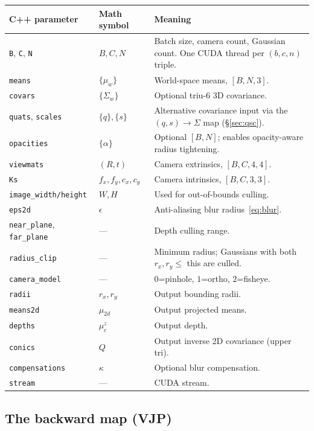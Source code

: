 \documentclass[11pt]{article}
\begin{document}
\begin{center}
\begin{tabular}{l l p{7.5cm}}
\hline
\textbf{C++ parameter} & \textbf{Math symbol} & \textbf{Meaning} \\
\hline
\texttt{B}, \texttt{C}, \texttt{N} & $B, C, N$ &
Batch size, camera count, Gaussian count. One CUDA thread per
$(b, c, n)$ triple. \\
\texttt{means} & $\{\mu_w\}$ & World-space means, $[B,N,3]$. \\
\texttt{covars} & $\{\Sigma_w\}$ & Optional triu-6 3D covariance. \\
\texttt{quats}, \texttt{scales} & $\{q\}, \{s\}$ & Alternative
covariance input via the $(q,s) \to \Sigma$ map (\S\ref{sec:qsc}). \\
\texttt{opacities} & $\{\alpha\}$ & Optional $[B,N]$; enables
opacity-aware radius tightening. \\
\texttt{viewmats} & $(R, t)$ & Camera extrinsics, $[B,C,4,4]$. \\
\texttt{Ks} & $f_x, f_y, c_x, c_y$ & Camera intrinsics, $[B,C,3,3]$. \\
\texttt{image\_width/height} & $W, H$ & Used for out-of-bounds culling. \\
\texttt{eps2d} & $\epsilon$ & Anti-aliasing blur radius~\eqref{eq:blur}. \\
\texttt{near\_plane}, \texttt{far\_plane} & --- & Depth culling range. \\
\texttt{radius\_clip} & --- & Minimum radius; Gaussians with both
$r_x, r_y \le$ this are culled. \\
\texttt{camera\_model} & --- & $0$=pinhole, $1$=ortho, $2$=fisheye. \\
\texttt{radii} & $r_x, r_y$ & Output bounding radii. \\
\texttt{means2d} & $\mu_{2d}$ & Output projected means. \\
\texttt{depths} & $\mu_c^z$ & Output depth. \\
\texttt{conics} & $Q$ & Output inverse 2D covariance (upper tri). \\
\texttt{compensations} & $\kappa$ & Optional blur compensation. \\
\texttt{stream} & --- & CUDA stream. \\
\hline
\end{tabular}
\end{center}

\subsection{The backward map (VJP)}
\label{sec:projection-bwd}
\end{document}
